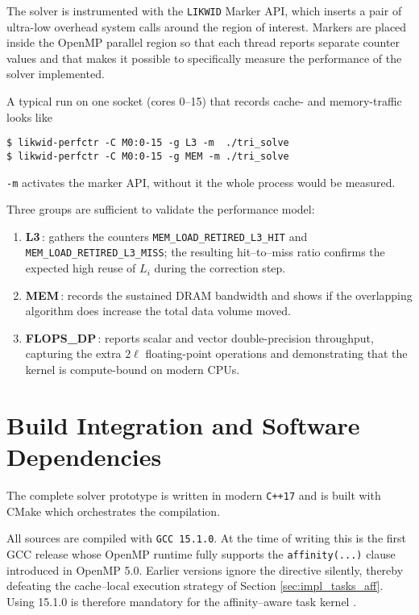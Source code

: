 The solver is instrumented with the \texttt{LIKWID}
Marker API, which inserts a pair of ultra-low overhead system calls
around the region of interest.  Markers are placed inside the OpenMP parallel region so that
each thread reports separate counter values and that makes it possible to specifically measure the performance of the solver implemented.

A typical run on one socket (cores 0–15) that records cache- and
memory-traffic looks like
\begin{verbatim}
$ likwid-perfctr -C M0:0-15 -g L3 -m  ./tri_solve
$ likwid-perfctr -C M0:0-15 -g MEM -m ./tri_solve
\end{verbatim}
\texttt{-m} activates the marker API, without it the whole
process would be measured.

Three groups are sufficient to validate the performance model:
\begin{enumerate}
  \item \textbf{L3}\,:  
        gathers the counters 
        \texttt{MEM\_LOAD\_RETIRED\_L3\_HIT} and
        \texttt{MEM\_LOAD\_RETIRED\_L3\_MISS};  
        the resulting hit–to–miss ratio confirms the expected high
        reuse of $L_i$ during the correction step.

  \item \textbf{MEM}\,:  
        records the sustained DRAM bandwidth and shows if the
        overlapping algorithm does increase the total data
        volume moved.

  \item \textbf{FLOPS\_DP}\,:  
        reports scalar and vector double-precision throughput,
        capturing the extra $2\ell$ floating-point operations and
        demonstrating that the kernel is compute-bound on modern CPUs.
\end{enumerate}

\section{Build Integration and Software Dependencies}
\label{chap:impl_build}

The complete solver prototype is written in modern \texttt{C++17} and is built with CMake
which orchestrates the compilation.

All sources are compiled with \texttt{GCC\,15.1.0}.  
At the time of writing this is the first GCC release whose OpenMP
runtime fully supports the \verb|affinity(...)| clause introduced in
OpenMP 5.0.  
Earlier versions ignore the directive silently, thereby defeating the
cache–local execution strategy of Section \ref{sec:impl_tasks_aff}.  
Using 15.1.0 is therefore mandatory for the affinity–aware task kernel \cite{OpenMPCompilers}.

